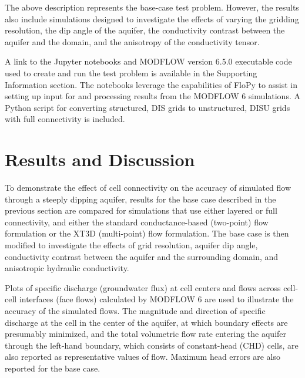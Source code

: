 \documentclass{article}
\begin{document}
The above description represents the base-case test problem. However, the results also include simulations designed to investigate the effects of varying the gridding resolution, the dip angle of the aquifer, the conductivity contrast between the aquifer and the domain, and the anisotropy of the conductivity tensor.

A link to the Jupyter notebooks and MODFLOW version 6.5.0 executable code used to create and run the test problem is available in the Supporting Information section. The notebooks leverage the capabilities of FloPy \citep{bakker2016scripting, hughes2024flopy} to assist in setting up input for and processing results from the MODFLOW 6 simulations. A Python script for converting structured, DIS grids to unstructured, DISU grids with full connectivity is included.

\section*{Results and Discussion}

To demonstrate the effect of cell connectivity on the accuracy of simulated flow through a steeply dipping aquifer, results for the base case described in the previous section are compared for simulations that use either layered or full connectivity, and either the standard conductance-based (two-point) flow formulation or the XT3D (multi-point) flow formulation. The base case is then modified to investigate the effects of grid resolution, aquifer dip angle, conductivity contrast between the aquifer and the surrounding domain, and anisotropic hydraulic conductivity.

Plots of specific discharge (groundwater flux) at cell centers and flows across cell-cell interfaces (face flows) calculated by MODFLOW 6 are used to illustrate the accuracy of the simulated flows. The magnitude and direction of specific discharge at the cell in the center of the aquifer, at which boundary effects are presumably minimized, and the total volumetric flow rate entering the aquifer through the left-hand boundary, which consists of constant-head (CHD) cells, are also reported as representative values of flow. Maximum head errors are also reported for the base case.
\end{document}
